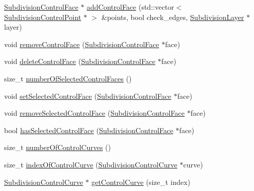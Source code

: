 \begin{DoxyCompactItemize}
\item 
\hyperlink{classShipCADGeometry_1_1SubdivisionControlFace}{Subdivision\-Control\-Face} $\ast$ \hyperlink{classShipCADGeometry_1_1SubdivisionSurface_a07d8ca69ed3d45f6e54407fcca8264b2}{add\-Control\-Face} (std\-::vector$<$ \hyperlink{classShipCADGeometry_1_1SubdivisionControlPoint}{Subdivision\-Control\-Point} $\ast$ $>$ \&points, bool check\-\_\-edges, \hyperlink{classShipCADGeometry_1_1SubdivisionLayer}{Subdivision\-Layer} $\ast$layer)
\item 
void \hyperlink{classShipCADGeometry_1_1SubdivisionSurface_a9cce3014753c0b74517b1747a80f6c2c}{remove\-Control\-Face} (\hyperlink{classShipCADGeometry_1_1SubdivisionControlFace}{Subdivision\-Control\-Face} $\ast$face)
\item 
void \hyperlink{classShipCADGeometry_1_1SubdivisionSurface_a394c490440fb20c37abfc2f38d6e50fd}{delete\-Control\-Face} (\hyperlink{classShipCADGeometry_1_1SubdivisionControlFace}{Subdivision\-Control\-Face} $\ast$face)
\item 
size\-\_\-t \hyperlink{classShipCADGeometry_1_1SubdivisionSurface_a98712984f4b918712ece45f32c4269fb}{number\-Of\-Selected\-Control\-Faces} ()
\item 
void \hyperlink{classShipCADGeometry_1_1SubdivisionSurface_ab21694a435e0c0dd6139de28ae543254}{set\-Selected\-Control\-Face} (\hyperlink{classShipCADGeometry_1_1SubdivisionControlFace}{Subdivision\-Control\-Face} $\ast$face)
\item 
void \hyperlink{classShipCADGeometry_1_1SubdivisionSurface_aef09d950b0970bd825a984effeee6224}{remove\-Selected\-Control\-Face} (\hyperlink{classShipCADGeometry_1_1SubdivisionControlFace}{Subdivision\-Control\-Face} $\ast$face)
\item 
bool \hyperlink{classShipCADGeometry_1_1SubdivisionSurface_aab0e513988645c868676831ae0093a25}{has\-Selected\-Control\-Face} (\hyperlink{classShipCADGeometry_1_1SubdivisionControlFace}{Subdivision\-Control\-Face} $\ast$face)
\item 
size\-\_\-t \hyperlink{classShipCADGeometry_1_1SubdivisionSurface_afd7bc97f31daf354830f234c205f4599}{number\-Of\-Control\-Curves} ()
\item 
size\-\_\-t \hyperlink{classShipCADGeometry_1_1SubdivisionSurface_af086dba8dcfe925ff9c814e6c72c44e8}{index\-Of\-Control\-Curve} (\hyperlink{classShipCADGeometry_1_1SubdivisionControlCurve}{Subdivision\-Control\-Curve} $\ast$curve)
\item 
\hyperlink{classShipCADGeometry_1_1SubdivisionControlCurve}{Subdivision\-Control\-Curve} $\ast$ \hyperlink{classShipCADGeometry_1_1SubdivisionSurface_a732c53d18277a4093ff7df12c0b08634}{get\-Control\-Curve} (size\-\_\-t index)

\end{DoxyCompactItemize}
